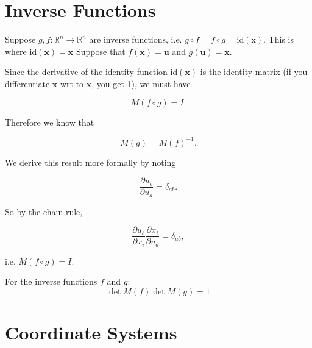 \section{Inverse Functions}

\begin{nthm}
	Suppose $g, f: \mathbb{R}^n \rightarrow \mathbb{R}^n$ are inverse functions, i.e. $g \circ f=f \circ g=\mathrm{id(x)}$. This is where $\mathrm{id(\mathbf{x})} = \mathbf{x}$ Suppose that $f(\mathbf{x})=\mathbf{u}$ and $g(\mathbf{u})=\mathbf{x}$.
	
	Since the derivative of the identity function $\mathrm{id(\mathbf{x})}$ is the identity matrix (if you differentiate $\mathbf{x}$ wrt to $\mathbf{x}$, you get 1), we must have
	
	$$
	M(f \circ g)=I .
	$$
	
	
	Therefore we know that
	
	$$
	M(g)=M(f)^{-1} .
	$$
	
	
	We derive this result more formally by noting
	
	$$
	\frac{\partial u_b}{\partial u_a}=\delta_{a b} .
	$$
	
	
	So by the chain rule,
	
	$$
	\frac{\partial u_b}{\partial x_i} \frac{\partial x_i}{\partial u_a}=\delta_{a b},
	$$
	
	i.e. $M(f \circ g)=I$.
\end{nthm}

\begin{nrem}[Determinants]
	For the inverse functions $f$ and $g$:
	$$\operatorname{det} M(f) \operatorname{det} M(g)=1$$
\end{nrem}

\section{Coordinate Systems}

